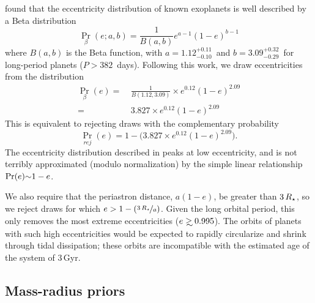 \documentclass[twocolumn]{aastex63}
\begin{document}
\citet{Kipping:2013} found that the eccentricity distribution of known exoplanets is well described by a Beta distribution
\begin{equation}
    {\Pr}_\beta(e;a,b) = \frac{1}{B(a,b)}e^{a-1}(1-e)^{b-1}
\end{equation}
\noindent where $B(a,b)$ is the Beta function, with $a = 1.12^{+0.11}_{-0.10}$\ and $b = 3.09^{+0.32}_{-0.29}$\ for long-period planets ($P>382$\ days). Following this work, we draw eccentricities from the distribution
\begin{equation}\label{eq:edist}
\begin{aligned}
    {\Pr}_\beta(e) =&~\frac{1}{B(1.12,3.09)} \times e^{0.12}(1-e)^{2.09} \\
               =&~3.827 \times e^{0.12}(1-e)^{2.09}
\end{aligned}
\end{equation}
\noindent This is equivalent to rejecting draws with the complementary probability
\begin{equation}
    {\Pr}_{rej}(e) = 1 - \big(3.827 \times e^{0.12}(1-e)^{2.09}\big).
\end{equation}
The eccentricity distribution described in  peaks at low eccentricity, and is not terribly approximated (modulo normalization) by the simple linear relationship $\Pr(e) \mathord{\sim} 1 - e$.

We also require that the periastron distance, $a (1 - e)$, be greater than $3\,\rstar$, so we reject draws for which $e > 1 - (\nicefrac{3\,\rstar}{a})$. Given the long orbital period, this only removes the most extreme eccentricities ($e \gsim 0.995$). The orbits of planets with such high eccentricities would be expected to rapidly circularize and shrink through tidal dissipation; these orbits are incompatible with the estimated age of the system of $3$\,Gyr.

\subsection{Mass-radius priors}
\label{sec:mr}
\end{document}
